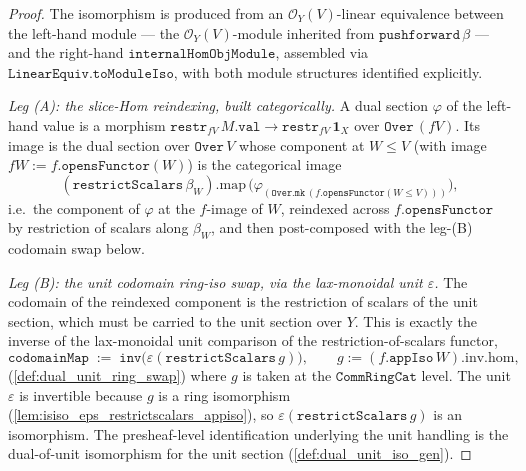\begin{proof}
  \leanok
  The isomorphism is produced from an \(\mathcal{O}_Y(V)\)-linear equivalence between the
  left-hand module --- the \(\mathcal{O}_Y(V)\)-module inherited from
  \(\mathtt{pushforward}\,\beta\) --- and the right-hand \(\mathtt{internalHomObjModule}\),
  assembled via \(\mathtt{LinearEquiv.toModuleIso}\), with both module structures
  identified explicitly.

  \emph{Leg (A): the slice-Hom reindexing, built categorically.} A dual section
  \(\varphi\) of the left-hand value is a morphism \(\mathtt{restr}_{fV}\,M.\mathtt{val} \to
  \mathtt{restr}_{fV}\,\mathbf{1}_X\) over \(\mathtt{Over}\,(fV)\). Its image is the dual
  section over \(\mathtt{Over}\,V\) whose component at \(W \le V\) (with image
  \(fW := f.\mathtt{opensFunctor}(W)\)) is the categorical image
  \[
    (\mathtt{restrictScalars}\,\beta_W).\mathrm{map}\,
      \bigl(\varphi_{(\mathtt{Over.mk}\,(f.\mathtt{opensFunctor}(W \le V)))}\bigr),
  \]
  i.e.\ the component of \(\varphi\) at the \(f\)-image of \(W\), reindexed across
  \(f.\mathtt{opensFunctor}\) by restriction of scalars along \(\beta_W\), and then
  post-composed with the leg-(B) codomain swap below.

  \emph{Leg (B): the unit codomain ring-iso swap, via the lax-monoidal unit \(\varepsilon\).}
  The codomain of the reindexed component is the restriction of scalars of the unit section,
  which must be carried to the unit section over \(Y\). This is exactly the inverse of the
  lax-monoidal unit comparison of the restriction-of-scalars functor,
  \[
    \mathtt{codomainMap} \;:=\;
      \mathtt{inv}\bigl(\varepsilon(\mathtt{restrictScalars}\,g)\bigr),
      \qquad g := (f.\mathtt{appIso}\,W).\mathrm{inv}.\mathrm{hom},
  \]
  (\cref{def:dual_unit_ring_swap})
  where \(g\) is taken at the \emph{\(\mathtt{CommRingCat}\)} level. The unit \(\varepsilon\)
  is invertible because \(g\) is a ring isomorphism
  (\cref{lem:isiso_eps_restrictscalars_appiso}),
  so \(\varepsilon(\mathtt{restrictScalars}\,g)\) is an isomorphism. The presheaf-level
  identification underlying the unit handling is the dual-of-unit isomorphism for the unit
  section (\cref{def:dual_unit_iso_gen}).


\end{proof}
